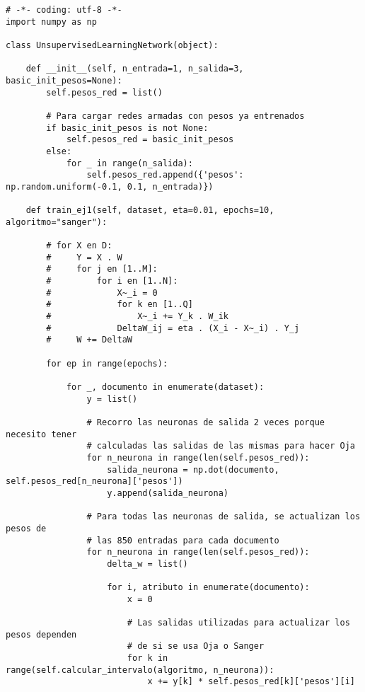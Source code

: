 \begin{changemargin}{-2.0cm}{-1.5cm} 
\begin{verbatim}
# -*- coding: utf-8 -*-
import numpy as np

class UnsupervisedLearningNetwork(object):

    def __init__(self, n_entrada=1, n_salida=3, basic_init_pesos=None):
        self.pesos_red = list()

        # Para cargar redes armadas con pesos ya entrenados
        if basic_init_pesos is not None:
            self.pesos_red = basic_init_pesos
        else:
            for _ in range(n_salida):
                self.pesos_red.append({'pesos': np.random.uniform(-0.1, 0.1, n_entrada)})

    def train_ej1(self, dataset, eta=0.01, epochs=10, algoritmo="sanger"):

        # for X en D:
        #     Y = X . W
        #     for j en [1..M]:
        #         for i en [1..N]:
        #             X~_i = 0
        #             for k en [1..Q]
        #                 X~_i += Y_k . W_ik
        #             DeltaW_ij = eta . (X_i - X~_i) . Y_j
        #     W += DeltaW

        for ep in range(epochs):
            
            for _, documento in enumerate(dataset):
                y = list()

                # Recorro las neuronas de salida 2 veces porque necesito tener
                # calculadas las salidas de las mismas para hacer Oja
                for n_neurona in range(len(self.pesos_red)):
                    salida_neurona = np.dot(documento, self.pesos_red[n_neurona]['pesos'])
                    y.append(salida_neurona)

                # Para todas las neuronas de salida, se actualizan los pesos de
                # las 850 entradas para cada documento
                for n_neurona in range(len(self.pesos_red)):           
                    delta_w = list()
                    
                    for i, atributo in enumerate(documento):
                        x = 0

                        # Las salidas utilizadas para actualizar los pesos dependen
                        # de si se usa Oja o Sanger
                        for k in range(self.calcular_intervalo(algoritmo, n_neurona)):
                            x += y[k] * self.pesos_red[k]['pesos'][i]


\end{verbatim}
\end{changemargin}
